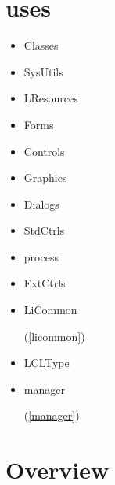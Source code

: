 \documentclass{report}
\begin{document}
\section{uses}
\begin{itemize}
\item \begin{ttfamily}Classes\end{ttfamily}\item \begin{ttfamily}SysUtils\end{ttfamily}\item \begin{ttfamily}LResources\end{ttfamily}\item \begin{ttfamily}Forms\end{ttfamily}\item \begin{ttfamily}Controls\end{ttfamily}\item \begin{ttfamily}Graphics\end{ttfamily}\item \begin{ttfamily}Dialogs\end{ttfamily}\item \begin{ttfamily}StdCtrls\end{ttfamily}\item \begin{ttfamily}process\end{ttfamily}\item \begin{ttfamily}ExtCtrls\end{ttfamily}\item \begin{ttfamily}LiCommon\end{ttfamily}(\ref{licommon})\item \begin{ttfamily}LCLType\end{ttfamily}\item \begin{ttfamily}manager\end{ttfamily}(\ref{manager})\end{itemize}
\section{Overview}
\begin{description}
\item[\texttt{\begin{ttfamily}TConvDisp\end{ttfamily} Class}]
\end{description}
\end{document}
